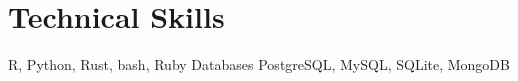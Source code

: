 \section{Technical Skills}

{R, Python, Rust, bash, Ruby}
{Databases}
{PostgreSQL, MySQL, SQLite, MongoDB}
